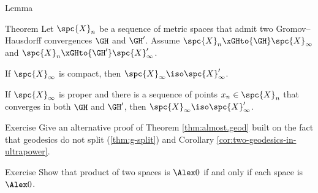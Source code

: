 




















\begin{thm}{Lemma}



\end{thm}


\begin{thm}{Theorem}
Let $\spc{X}_n$ be a sequence of metric spaces that admit 
two Gromov--Hausdorff convergences
$\GH$ and $\GH'$.
Assume 
$\spc{X}_n\xGHto{\GH}\spc{X}_\infty$ and $\spc{X}_n\xGHto{\GH'}\spc{X}_\infty'$.
\begin{subthm}{}
If  $\spc{X}_\infty$ is compact, then $\spc{X}_\infty\iso\spc{X}_\infty'$.
\end{subthm}

\begin{subthm}{}
If  $\spc{X}_\infty$ is proper and there is a sequence of points $x_n\in \spc{X}_n$ 
that converges in both
$\GH$ and $\GH'$, then $\spc{X}_\infty\iso\spc{X}_\infty'$.
\end{subthm}
\end{thm}


















\begin{thm}{Exercise}\label{ex:non-split-almost.geod}
Give an alternative proof of Theorem \ref{thm:almost.geod} 
built on the fact that geodesics do not split (\ref{thm:g-split})
and Corollary \ref{cor:two-geodesics-in-ultrapower}.
\end{thm}




\begin{thm}{Exercise}\label{ex:cbb-product}
Show that product of two spaces is $\Alex0$ if and only if each space is $\Alex0$.
\end{thm}
















